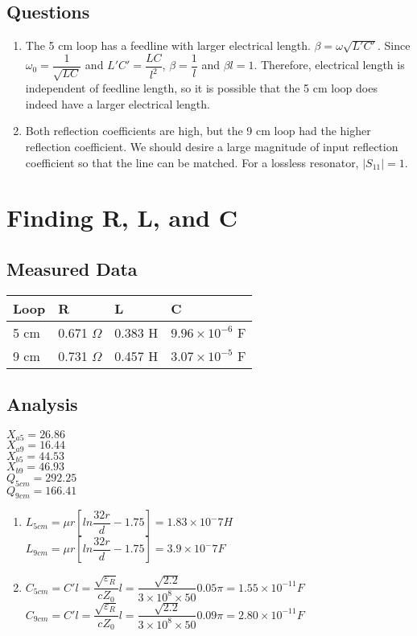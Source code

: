 \documentclass{article}
\begin{document}
\subsection{Questions}
\begin{enumerate}
	\item The 5 cm loop has a feedline with larger electrical length. $\beta = \omega\sqrt{L'C'}$. Since $\omega_0 = \dfrac{1}{\sqrt{LC}}$ and $L'C' = \dfrac{LC}{l^2}$, $\beta = \dfrac{1}{l}$ and $\beta l = 1$. Therefore, electrical length is independent of feedline length, so it is possible that the 5 cm loop does indeed have a larger electrical length.
	\item Both reflection coefficients are high, but the 9 cm loop had the higher reflection coefficient. We should desire a large magnitude of input reflection coefficient so that the line can be matched. For a lossless resonator, $\vert S_{11} \vert = 1$.
\end{enumerate}


\section{Finding R, L, and C}

\subsection{Measured Data}
\begin{table}[H]
\centering
\begin{tabular}{|l|l|l|l|}
\hline
Loop & R & L & C \\ \hline
5 cm & 0.671 $\Omega$  & 0.383 H  & $9.96\times10^{-6}$ F \\ \hline
9 cm & 0.731 $\Omega$  & 0.457 H & $3.07\times10^{-5}$ F \\ \hline
\end{tabular}
\end{table}

\subsection{Analysis}
$X_{a5} = 26.86$ \\
$X_{a9} = 16.44$ \\
$X_{b5} = 44.53$ \\
$X_{b9} = 46.93$ \\
$Q_{5cm} = 292.25$ \\
$Q_{9cm} = 166.41$ \\
\begin{enumerate}
	\item $L_{5cm} = \mu r[ln\dfrac{32r}{d} - 1.75] = 1.83\times 10^-7 H$ \\
		  $L_{9cm} = \mu r[ln\dfrac{32r}{d} - 1.75] = 3.9\times 10^-7 F$
	\item $C_{5cm} = C'l = \dfrac{\sqrt{\varepsilon_R}}{cZ_0}l = \dfrac{\sqrt{2.2}}{3\times10^8\times50} 0.05\pi = 1.55\times10^{-11} F$ \\
	$C_{9cm} = C'l = \dfrac{\sqrt{\varepsilon_R}}{cZ_0}l = \dfrac{\sqrt{2.2}}{3\times10^8\times50} 0.09\pi = 2.80\times10^{-11} F$ \\
\end{enumerate}
\end{document}
